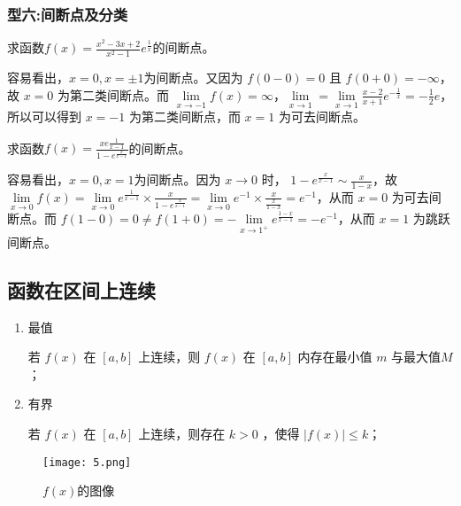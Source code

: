           \subsubsection*{型六:间断点及分类}
          \begin{example}
              求函数$ f(x) =\displaystyle\frac{x^2-3x+2}{x^2-1}e^{\frac{1}{x}}$的间断点。
          \end{example}

          \begin{solution}
              容易看出，$ x=0, x=\pm 1$为间断点。又因为 $f(0-0)=0$ 且 $f(0+0)=-\infty$，故 $x=0$ 为第二类间断点。而 $\lim\limits_{x\to -1}f(x)=\infty$，$\lim\limits_{x \to 1} = \lim\limits_{x \to 1}\frac{x-2}{x+1}e^{-\frac{1}{x}}=-\frac{1}{2}e$，所以可以得到 $x=-1$ 为第二类间断点，而 $x=1$ 为可去间断点。
          \end{solution}
   
          \begin{example}
            求函数$ f(x) =\displaystyle\frac{x e\frac{1}{x-1}}{1-e^{\frac{x}{x-1}}}$的间断点。
        \end{example}

        \begin{solution}
            容易看出，$ x=0, x=1$为间断点。因为 $x \to 0$ 时，  $1-e^{\frac{x}{x-1}} \sim \displaystyle\frac{x}{1-x}$，故 $\lim\limits_{x \to 0}f(x) = \lim\limits_{x \to 0}e^{\frac{1}{x-1}}\times \displaystyle\frac{x}{1-e^{\frac{x}{x-1}}}=\lim\limits_{x\to 0}e^{-1}\times\displaystyle\frac{x}{\frac{x}{1-x}}=e^{-1}$，从而 $x=0$ 为可去间断点。而 $f(1-0)=0 \neq f(1+0)=-\lim\limits_{x\to 1^+}e^{\frac{1-x}{x-1}}=-e^{-1}$，从而 $x=1$ 为跳跃间断点。
        \end{solution}

        \subsection{函数在区间上连续}
        \begin{enumerate}
            \item 最值
            
            若 $f(x)$ 在 $[a,b]$ 上连续，则 $f(x)$ 在 $[a,b]$ 内存在最小值 $m$ 与最大值$M$；
            \item 有界
            
            若 $f(x)$ 在 $[a,b]$ 上连续，则存在 $k>0$ ，使得 $|f(x)|\leq k$；
        \end{enumerate}
        \begin{figure}[htbp]
            \centering
            \texttt{[image: 5.png]}
            \caption{$f(x)$的图像}
          \end{figure}


